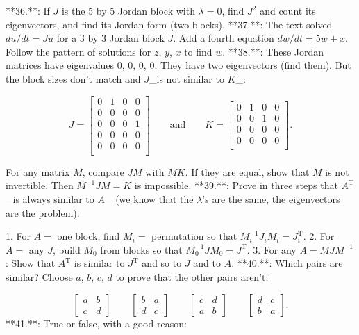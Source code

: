 

**36.**: If \(J\) is the 5 by 5 Jordan block with \(\lambda=0\), find \(J^{2}\) and count its eigenvectors, and find its Jordan form (two blocks).
**37.**: The text solved \(du/dt=Ju\) for a 3 by 3 Jordan block \(J\). Add a fourth equation \(dw/dt=5w+x\). Follow the pattern of solutions for \(z\), \(y\), \(x\) to find \(w\).
**38.**: These Jordan matrices have eigenvalues 0, 0, 0, 0. They have two eigenvectors (find them). But the block sizes don't match and \(J\)_is not similar to \(K\)_:

\[J=\left[\begin{array}{c|c|c}0&1&0&0\\ 0&0&0&0\\ \hline 0&0&0&1\\ 0&0&0&0\\ \hline 0&0&0&0\\ \end{array}\right]\qquad\text{and}\qquad K=\left[\begin{array}{ccc|c}0&1&0&0 \\ 0&0&1&0\\ 0&0&0&0\\ \hline 0&0&0&0\\ \end{array}\right].\]

For any matrix \(M\), compare \(JM\) with \(MK\). If they are equal, show that \(M\) is not invertible. Then \(M^{-1}JM=K\) is impossible.
**39.**: Prove in three steps that \(A^{\mathrm{T}}\)_is always similar to \(A\)_ (we know that the \(\lambda\)'s are the same, the eigenvectors are the problem):

1. For \(A=\) one block, find \(M_{i}=\) permutation so that \(M_{i}^{-1}J_{i}M_{i}=J_{i}^{\mathrm{T}}\).
2. For \(A=\) any \(J\), build \(M_{0}\) from blocks so that \(M_{0}^{-1}JM_{0}=J^{\mathrm{T}}\).
3. For any \(A=MJM^{-1}\): Show that \(A^{\mathrm{T}}\) is similar to \(J^{\mathrm{T}}\) and so to \(J\) and to \(A\).
**40.**: Which pairs are similar? Choose \(a\), \(b\), \(c\), \(d\) to prove that the other pairs aren't:

\[\begin{bmatrix}a&b\\ c&d\end{bmatrix}\qquad\begin{bmatrix}b&a\\ d&c\end{bmatrix}\qquad\begin{bmatrix}c&d\\ a&b\end{bmatrix}\qquad\begin{bmatrix}d&c\\ b&a\end{bmatrix}.\]
**41.**: True or false, with a good reason:

